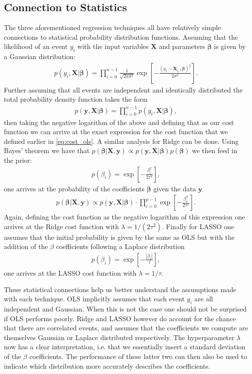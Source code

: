 \documentclass[%
reprint,
amsmath,amssymb,
aps,
pra,
]{revtex4-2}
\begin{document}
\subsection{Connection to Statistics}
\label{sec:stats}
The three aforementioned regression techniques all have relatively simple connections to statistical probability distribution functions. Assuming that the likelihood of an event $y_i$ with the input variables $\bm X$ and parameters $\bm\beta$ is given by a Gaussian distribution:
\begin{align}
	p(y_i,\bm X|\bm\beta)=\prod_{i=0}^{n-1}\frac{1}{\sqrt{2\pi\sigma^2}}\exp\left[-\frac{(y_i-\bm X_{i,*}\bm\beta)^2}{2\sigma^2}\right].
\end{align}
Further assuming that all events are independent and identically distributed the total probability density function takes the form
\begin{align}
	p(\bm y,\bm X|\bm\beta)=\prod_{i=0}^{n-1}p(y_i,\bm X|\bm\beta),
\end{align}
then taking the negative logarithm of the above and defining that as our cost function we can arrive at the exact expression for the cost function that we defined earlier in \eqref{eq:cost_ols}. A similar analysis for Ridge can be done. Using Bayes' theorem we have that $p(\bm\beta|\bm X,\bm y)\propto p(\bm y,\bm X|\bm\beta)p(\bm\beta)$ we then feed in the prior:
\begin{align}
	p(\beta_i)=\exp\left[-\frac{\beta_i^2}{2\tau^2}\right],
\end{align}
one arrives at the probability of the coefficients $\bm\beta$ given the data $\bm y$
\begin{align}
	p(\bm\beta|\bm X,\bm y)\propto p(\bm y,\bm X|\bm\beta)\cdot\prod_{i=0}^{p-1}\exp\left[-\frac{\beta_i^2}{2\tau^2}\right].
\end{align}
Again, defining the cost function as the negative logarithm of this expression one arrives at the Ridge cost function with $\lambda=1/(2\tau^2)$. Finally for LASSO one assumes that the initial probability is given by the same as OLS but with the addition of the $\beta$ coefficients following a Laplace distribution
\begin{align}
	p(\beta_i)=\exp\left[-\frac{|\beta_i|}{\tau}\right],
\end{align}
one arrives at the LASSO cost function with $\lambda=1/\tau$. 

These statistical connections help us better understand the assumptions made with each technique. OLS implicitly assumes that each event $y_i$ are all independent and Gaussian. When this is not the case one should not be surprised if OLS performs poorly. Ridge and LASSO however do account for the chance that there are correlated events, and assumes that the coefficients we compute are themselves Gaussian or Laplace distributed respectively. The hyperparameter $\lambda$ now has a clear interpretation, i.e. that we essentially insert a standard deviation of the $\beta$ coefficients. The performance of these latter two can then also be used to indicate which distribution more accurately describes the coefficients.
\end{document}
